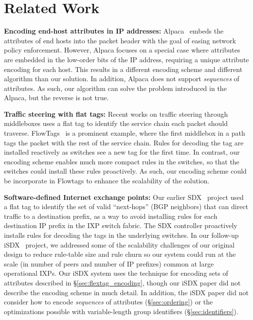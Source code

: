 \section{Related Work} 
\label{sec:related}

\textbf{Encoding end-host attributes in IP addresses:} Alpaca~\cite{alpaca} embeds the attributes of end hosts into the packet header with the goal of easing network policy enforcement.  However, Alpaca focuses on a special case where attributes are embedded in the low-order bits of the IP address, requiring a unique attribute encoding for each host.  This results in a different encoding scheme and different algorithm than our solution.  In addition, Alpaca does not support \emph{sequences} of attributes.  As such, our algorithm can solve the problem introduced in the Alpaca, but the reverse is not true.

\textbf{Traffic steering with flat tags:} Recent works on traffic steering through middleboxes uses a flat tag to identify the service chain each packet should traverse.  FlowTags~\cite{flowtags} is a prominent example, where the first middlebox in a path tags the packet with the rest of the service chain.  Rules for decoding the tag are installed reactively as switches see a new tag for the first time.  In contrast, our encoding scheme enables much more compact rules in the switches, so that the switches could install these rules proactively.  As such, our encoding scheme could be incorporate in Flowtags to enhance the scalability of the solution.

\textbf{Software-defined Internet exchange points:} Our earlier SDX~\cite{sdx} project used a flat tag to identify the set of valid ``next-hops'' (BGP neighbors) that can direct traffic to a destination prefix, as a way to avoid installing rules for each destination IP prefix in the IXP switch fabric.  The SDX controller proactively installs rules for decoding the tags in the underlying switches.  In our follow-up iSDX~\cite{isdx} project, we addressed some of the scalability challenges of our original design to reduce rule-table size and rule churn so our system could run at the scale (in number of peers and number of IP prefixes) common at large operational IXPs.  Our iSDX system uses the technique for encoding sets of attributes described in \S\ref{sec:flextag_encoding}, though our iSDX paper did not describe the encoding scheme in much detail.  In addition, the iSDX paper did not consider how to encode \emph{sequences} of attributes (\S\ref{sec:ordering}) or the optimizations possible with variable-length group identifiers (\S\ref{sec:identifiers}).

